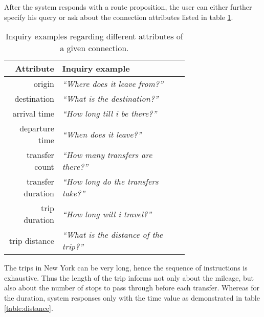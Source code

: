 After the system responds with a route proposition, the user can either further specify his query or ask about the connection attributes listed in table \ref{table:attributes}.

\begin{table}[h]
\centering
\begin{tabular}{ r | p{0.7\linewidth} }
	\textbf{Attribute} & \textbf{Inquiry example} \\ \hline
	origin & \textit{``Where does it leave from?''} \\
	destination & \textit{``What is the destination?''} \\
	arrival time & \textit{``How long till i be there?''} \\
	departure time & \textit{``When does it leave?''} \\
	transfer count & \textit{``How many transfers are there?''} \\
	transfer duration & \textit{``How long do the transfers take?''} \\
	trip duration & \textit{``How long will i travel?''} \\
	trip distance & \textit{``What is the distance of the trip?''}
\end{tabular}
\caption[Details about provided connection]{Inquiry examples regarding different attributes of a given connection.}
\label{table:attributes}
\end{table}

The trips in New York can be very long, hence the sequence of instructions is exhaustive.
Thus the length of the trip informs not only about the mileage, but also about the number of stops to pass through before each transfer.
Whereas for the duration, system responses only with the time value as demonstrated in table \ref{table:distance}.

